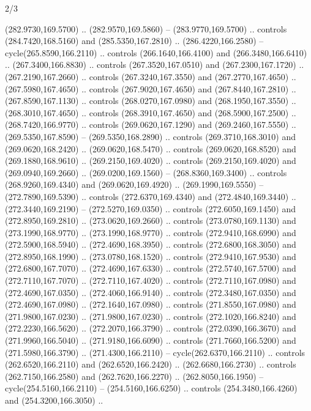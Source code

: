 \begin{flagdescription}{2/3}
\begin{scope}[xshift=0.5\flaglength,yshift=0.5\flagwidth,scale=\flagwidth/259.2]
\begin{scope}[y=0.8pt, x=0.8pt, yscale=-1,shift={(-243,-162)}]
      (282.9730,169.5700) .. (282.9570,169.5860) -- (283.9770,169.5700) .. controls
      (284.7420,168.5160) and (285.5350,167.2810) .. (286.4220,166.2580) --
      cycle(265.8590,166.2110) .. controls (266.1640,166.4100) and
      (266.3480,166.6410) .. (267.3400,166.8830) .. controls (267.3520,167.0510) and
      (267.2300,167.1720) .. (267.2190,167.2660) .. controls (267.3240,167.3550) and
      (267.2770,167.4650) .. (267.5980,167.4650) .. controls (267.9020,167.4650) and
      (267.8440,167.2810) .. (267.8590,167.1130) .. controls (268.0270,167.0980) and
      (268.1950,167.3550) .. (268.3010,167.4650) .. controls (268.3910,167.4650) and
      (268.5900,167.2500) .. (268.7420,166.9770) .. controls (269.0620,167.1290) and
      (269.2460,167.5550) .. (269.5350,167.8590) -- (269.5350,168.2890) .. controls
      (269.3710,168.3010) and (269.0620,168.2420) .. (269.0620,168.5470) .. controls
      (269.0620,168.8520) and (269.1880,168.9610) .. (269.2150,169.4020) .. controls
      (269.2150,169.4020) and (269.0940,169.2660) .. (269.0200,169.1560) --
      (268.8360,169.3400) .. controls (268.9260,169.4340) and (269.0620,169.4920) ..
      (269.1990,169.5550) -- (272.7890,169.5390) .. controls (272.6370,169.4340) and
      (272.4840,169.3440) .. (272.3440,169.2190) -- (272.5270,169.0350) .. controls
      (272.6050,169.1450) and (272.8950,169.2810) .. (273.0620,169.2660) .. controls
      (273.0780,169.1130) and (273.1990,168.9770) .. (273.1990,168.9770) .. controls
      (272.9410,168.6990) and (272.5900,168.5940) .. (272.4690,168.3950) .. controls
      (272.6800,168.3050) and (272.8950,168.1990) .. (273.0780,168.1520) .. controls
      (272.9410,167.9530) and (272.6800,167.7070) .. (272.4690,167.6330) .. controls
      (272.5740,167.5700) and (272.7110,167.7070) .. (272.7110,167.4020) .. controls
      (272.7110,167.0980) and (272.4690,167.0350) .. (272.4060,166.9140) .. controls
      (272.3480,167.0350) and (272.4690,167.0980) .. (272.1640,167.0980) .. controls
      (271.8550,167.0980) and (271.9800,167.0230) .. (271.9800,167.0230) .. controls
      (272.1020,166.8240) and (272.2230,166.5620) .. (272.2070,166.3790) .. controls
      (272.0390,166.3670) and (271.9960,166.5040) .. (271.9180,166.6090) .. controls
      (271.7660,166.5200) and (271.5980,166.3790) .. (271.4300,166.2110) --
      cycle(262.6370,166.2110) .. controls (262.6520,166.2110) and
      (262.6520,166.2420) .. (262.6680,166.2730) .. controls (262.7150,166.2580) and
      (262.7620,166.2270) .. (262.8050,166.1950) -- cycle(254.5160,166.2110) --
      (254.5160,166.6250) .. controls (254.3480,166.4260) and (254.3200,166.3050) ..

\end{scope}
\end{scope}
\end{flagdescription}
